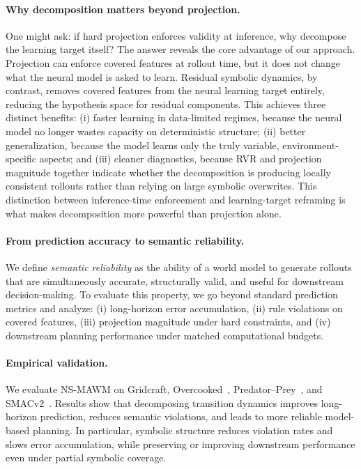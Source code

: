 \documentclass{article}
\theoremstyle{plain}
\theoremstyle{definition}
\theoremstyle{remark}
\begin{document}
\paragraph{Why decomposition matters beyond projection.}
One might ask: if hard projection enforces validity at inference, why decompose the learning target itself? The answer reveals the core advantage of our approach. Projection can enforce covered features at rollout time, but it does not change what the neural model is asked to learn. Residual symbolic dynamics, by contrast, removes covered features from the neural learning target entirely, reducing the hypothesis space for residual components. This achieves three distinct benefits: (i) faster learning in data-limited regimes, because the neural model no longer wastes capacity on deterministic structure; (ii) better generalization, because the model learns only the truly variable, environment-specific aspects; and (iii) cleaner diagnostics, because RVR and projection magnitude together indicate whether the decomposition is producing locally consistent rollouts rather than relying on large symbolic overwrites. This distinction between inference-time enforcement and learning-target reframing is what makes decomposition more powerful than projection alone.

\paragraph{From prediction accuracy to semantic reliability.}
We define \emph{semantic reliability} as the ability of a world model to generate rollouts that are simultaneously accurate, structurally valid, and useful for downstream decision-making. To evaluate this property, we go beyond standard prediction metrics and analyze:
(i) long-horizon error accumulation,
(ii) rule violations on covered features,
(iii) projection magnitude under hard constraints, and
(iv) downstream planning performance under matched computational budgets.

\paragraph{Empirical validation.}
We evaluate NS-MAWM on Gridcraft, Overcooked~\cite{Micah2020overcooked}, Predator--Prey~\cite{lowe2017multi}, and SMACv2~\cite{Ellis2023smacv2}. Results show that decomposing transition dynamics improves long-horizon prediction, reduces semantic violations, and leads to more reliable model-based planning. In particular, symbolic structure reduces violation rates and slows error accumulation, while preserving or improving downstream performance even under partial symbolic coverage.
\end{document}
